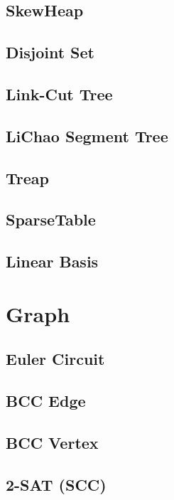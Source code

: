 \documentclass[a4paper,10pt,twocolumn,oneside]{article}
\begin{document}
\subsection{SkewHeap}

\subsection{Disjoint Set}

\subsection{Link-Cut Tree}

\subsection{LiChao Segment Tree}

\subsection{Treap}

\subsection{SparseTable}

\subsection{Linear Basis}


\section{Graph}
\subsection{Euler Circuit}

\subsection{BCC Edge}

\subsection{BCC Vertex}

\subsection{2-SAT (SCC)}

\end{document}
